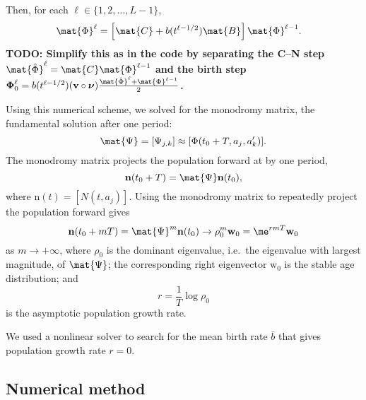 \documentclass{jpmarticle}
\renewcommand{\vec}[1]{\boldsymbol{\mathrm{#1}}}
\begin{document}
Then, for each $\ell \in \{1, 2, \ldots, L - 1\}$,
\begin{equation}
  \begin{split}
    \mat{\Phi}^{\ell}
    &=
    \left[
      \mat{C}
      + b(t^{\ell - 1 / 2}) \mat{B}
    \right]
    \mat{\Phi}^{\ell - 1}.
  \end{split}
\end{equation}
\textbf{TODO: Simplify this as in the code by separating the C–N step
  $\mat{\hat{\Phi}}^{\ell} = \mat{C} \mat{\Phi}^{\ell - 1}$
  and the birth step
  $\vec{\Phi}_0^{\ell} = b(t^{\ell - 1 / 2}) (\vec{v} \circ \vec{\nu})
  \frac{\mat{\hat{\Phi}}^{\ell} + \mat{\Phi}^{\ell - 1}}{2}$.}

Using this numerical scheme, we solved for the monodromy matrix, the
fundamental solution after one period:
\begin{equation}
  \mat{\Psi} = [\Psi_{j, k}] \approx [\Phi(t_0 + T, a_j, a'_k)].
\end{equation}
The monodromy matrix projects the population forward at by one period,
\begin{equation}
  \vec{n}(t_0 + T) = \mat{\Psi} \vec{n}(t_0),
\end{equation}
where $\vec{n}(t) = [N(t, a_j)]$.
Using the monodromy matrix to repeatedly project the population
forward gives
\begin{equation}
  \vec{n}(t_0 + m T)
  = \mat{\Psi}^m \vec{n}(t_0)
  \to \rho_0^m \vec{w}_0
  = \me^{r m T} \vec{w}_0
\end{equation}
as $m \to +\infty$, where $\rho_0$ is the dominant eigenvalue,
i.e.~the eigenvalue with largest magnitude, of $\mat{\Psi}$;
the corresponding right eigenvector $\vec{w}_0$ is the stable age
distribution; and
\begin{equation}
  r = \frac{1}{T} \log \rho_0
\end{equation}
is the asymptotic population growth rate.

We used a nonlinear solver to search for the mean birth rate $\bar{b}$
that gives population growth rate $r = 0$.


\subsection{Numerical method}
\end{document}
